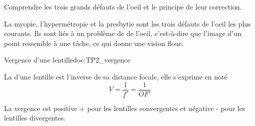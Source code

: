 \tetePremStssVisi



\begin{objectifs}
  \item Comprendre les trois grands défauts de l'oeil et le principe de leur correction.
\end{objectifs}

\begin{contexte}
  La myopie, l'hypermétropie et la presbytie sont les trois défauts de l'oeil les plus courants.
  Ils sont liés à un problème de  de l'oeil, c'est-à-dire que l'image d'un point ressemble à une tâche, ce qui donne une vision floue.
  
\end{contexte}


\begin{doc}{Vergence d'une lentille}{doc:TP2_vergence}
  \begin{importants}
    La  d'une lentille est l'inverse de sa distance focale, elle s'exprime en  noté \unit{\dioptre}
    \begin{equation*}  
      V = \dfrac{1}{f'} = \dfrac{1}{OF'}
    \end{equation*}
  \end{importants}

  La vergence est positive + pour les lentilles convergentes et négative - pour les lentilles divergentes.
\end{doc}

